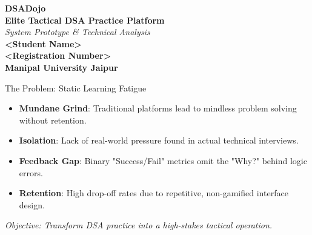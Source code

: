 \documentclass[aspectratio=169, dark]{beamer}
\begin{document}
\begin{frame}[plain]
    \centering
    
    \vspace{2cm}
    {\Huge \textbf{DSADojo}} \\
    \vspace{0.3cm}
    {\large \textbf{Elite Tactical DSA Practice Platform}} \\
    \vspace{1cm}
    \textit{System Prototype \& Technical Analysis} \\
    \vspace{1.5cm}
    \textbf{<Student Name>} \\
    \textbf{<Registration Number>} \\
    \vspace{0.5cm}
    \textbf{Manipal University Jaipur}
\end{frame}

\begin{frame}{The Problem: Static Learning Fatigue}
    \begin{itemize}
        \item \textbf{Mundane Grind}: Traditional platforms lead to mindless problem solving without retention.
        \item \textbf{Isolation}: Lack of real-world pressure found in actual technical interviews.
        \item \textbf{Feedback Gap}: Binary "Success/Fail" metrics omit the "Why?" behind logic errors.
        \item \textbf{Retention}: High drop-off rates due to repetitive, non-gamified interface design.
    \end{itemize}
    \vspace{0.5cm}
    \centering
    \textit{Objective: Transform DSA practice into a high-stakes tactical operation.}
\end{frame}
\end{document}
